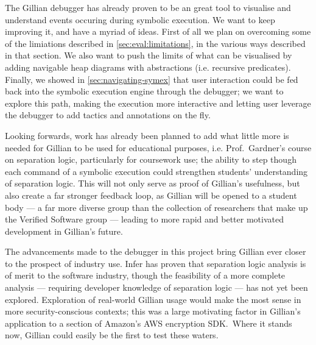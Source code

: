 
The Gillian debugger has already proven to be an great tool to visualise and
understand events occuring during symbolic execution. We want to keep improving
it, and have a myriad of ideas. First of all we plan on overcoming some of the
limiations described in \autoref{sec:eval:limitations}, in the various ways
described in that section. We also want to push the limits
of what can be visualised by adding navigable heap diagrams with abstractions
(i.e. recursive predicates). Finally, we showed in
\autoref{sec:navigating-symex} that user interaction could be fed back into
the symbolic execution engine through the debugger; we want to explore this
path, making the execution more interactive and letting user leverage the
debugger to add tactics and annotations on the fly.

Looking forwards, work has already been planned to add what little more is
needed for Gillian to be used for educational purposes, i.e. Prof.\ Gardner's
course on separation logic, particularly for coursework use; the ability to step
though each command of a symbolic execution could strengthen students'
understanding of separation logic. This will not only serve as proof of
Gillian's usefulness, but also create a far stronger feedback loop, as Gillian
will be opened to a student body --- a far more diverse group than the
collection of researchers that make up the Verified Software group --- leading
to more rapid and better motivated development in Gillian's future.

The advancements made to the debugger in this project bring Gillian ever closer
to the prospect of industry use. Infer has proven that separation logic analysis
is of merit to the software industry, though the feasibility of a more complete
analysis --- requiring developer knowledge of separation logic --- has not yet
been explored. Exploration of real-world Gillian usage would make the most sense
in more security-conscious contexts; this was a large motivating factor in
Gillian's application to a section of Amazon's AWS encryption SDK.\ Where it
stands now, Gillian could easily be the first to test these waters. 


